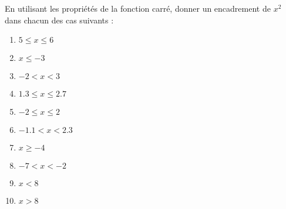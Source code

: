 
\begin{exercice}\label{exosmath-0139}

    En utilisant les propriétés de la fonction carré, donner un encadrement de \( x^2\) dans chacun des cas suivants :
    \begin{multicols}{3}
    \begin{enumerate}
        \item
            \( 5\leq x\leq 6\)
        \item
            \( x\leq -3\)
        \item
            \( -2 < x < 3\)
        \item
            \( 1.3\leq x\leq 2.7\)
        \item
            \( -2\leq x\leq 2\)
        \item
            \( -1.1< x<2.3\)
        \item
            \( x\geq -4\)
        \item
            \( -7<x<-2\)
        \item
            \( x<8\)
        \item
            \( x>8\)
    \end{enumerate}
    \end{multicols}

\end{exercice}
